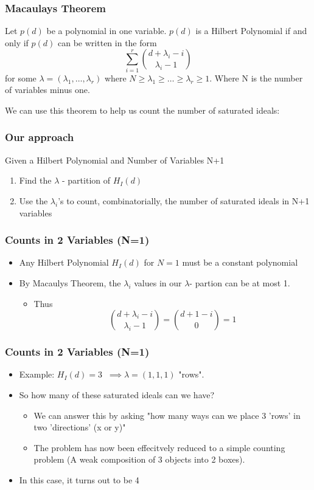 \documentclass{beamer}
\begin{document}
\begin{frame}
	\frametitle{Macaulays Theorem}
	\begin{theorem}
   Let $p(d)$ be a polynomial in one variable. $p(d)$ is a Hilbert Polynomial if and only if $p(d)$ can be written in the form 
   \[\sum_{i=1}^{r}\binom{d+\lambda_i -i}{\lambda_i -1}\] for some $\lambda= (\lambda_1,\hdots,\lambda_r)$  where $N \geq \lambda_1 \geq \hdots \geq \lambda_r \geq 1$. Where N is the number of variables minus one.

	\end{theorem}
	We can use this theorem to help us count the number of saturated ideals:
\end{frame}


\begin{frame}
	\frametitle{Our approach}
	Given a Hilbert Polynomial and Number of Variables N+1
	\begin{enumerate}
	\item Find the $\lambda$ - partition of $H_I(d)$ 
	\item Use the $\lambda_i$'s to count, combinatorially, the number of saturated ideals in N+1 variables
	\end{enumerate}
\end{frame}

\begin{frame}
	\frametitle{Counts in 2 Variables (N=1)}
	\begin{itemize}
	\item Any Hilbert Polynomial $H_I(d)$ for $N=1$ must be a constant polynomial
	\item By Macaulys Theorem, the $\lambda_i$ values in our $\lambda$- partion can be at most 1.
	\begin{itemize}
		\item Thus \[ \binom{d+\lambda_i -i}{\lambda_i-1} = \binom{d+1-i}{0} =1
		\]
	\end{itemize}
	\end{itemize}
\end{frame}

\begin{frame}
	\frametitle{Counts in 2 Variables (N=1)}
	\begin{itemize}
	\item Example: $H_I(d)=3 \;\; \implies \lambda = (1,1,1) $ \; "rows".
	\item So how many of these saturated ideals can we have?
	\begin{itemize}
		\item We can answer this by asking "how many ways can we place 3 'rows' in two 'directions' (x or y)"
		\item The problem has now been effecitvely reduced to a simple counting problem (A weak composition of 3 objects into 2 boxes).
	\end{itemize}
	\item In this case, it turns out to be 4 

	\end{itemize}
\end{frame}
\end{document}
